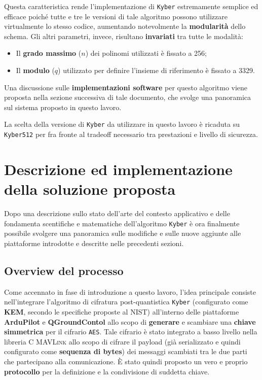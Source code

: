 \documentclass[a4paper, 12pt, oneside]{article}
\theoremstyle{definition}
\begin{document}
Questa caratteristica rende l'implementazione di \texttt{Kyber} estremamente semplice ed efficace poiché tutte e tre le versioni di tale algoritmo possono utilizzare virtualmente lo stesso codice, aumentando notevolmente la \textbf{modularità} dello schema.
\newpage
Gli altri parametri, invece, risultano \textbf{invariati} tra tutte le modalità:

\begin{itemize}
    \item Il \textbf{grado massimo} ($n$) dei polinomi utilizzati è fissato a 256;
    \item Il \textbf{modulo} ($q$) utilizzato per definire l'insieme di riferimento è fissato a 3329.
\end{itemize}

Una discussione sulle \textbf{implementazioni software} per questo algoritmo viene proposta nella sezione successiva di tale documento, che svolge una panoramica sul sistema proposto in questo lavoro.

La scelta della versione di \texttt{Kyber} da utilizzare in questo lavoro è ricaduta su \texttt{Kyber512} per fra fronte al tradeoff necessario tra prestazioni e livello di sicurezza.

\newpage
\section{Descrizione ed implementazione della soluzione proposta}
Dopo una descrizione sullo stato dell'arte del contesto applicativo e delle fondamenta scentifiche e matematiche dell'algoritmo \texttt{Kyber} è ora finalmente possibile svolgere una panoramica sulle modifiche e sulle nuove aggiunte alle piattaforme introdotte e descritte nelle precedenti sezioni.

\subsection{Overview del processo}
Come accennato in fase di introduzione a questo lavoro, l'idea principale consiste nell'integrare l'algoritmo di cifratura post-quantistica \texttt{Kyber} (configurato come \textbf{KEM}, secondo le specifiche proposte al NIST) all'interno delle piattaforme \textbf{ArduPilot} e \textbf{QGroundContol} allo scopo di \textbf{generare} e scambiare una \textbf{chiave simmetrica} per il cifrario \texttt{AES}. Tale cifrario è stato integrato a basso livello nella libreria C \textsc{MAVLink} allo scopo di cifrare il payload (già serializzato e quindi configurato come \textbf{sequenza di bytes}) dei messaggi scambiati tra le due parti che partecipano alla comunicazione. È stato quindi proposto un vero e proprio \textbf{protocollo} per la definizione e la condivisione di suddetta chiave.
\end{document}
